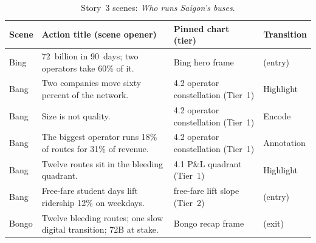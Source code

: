 \begin{table}[!htbp]
\centering
\caption{Story~3 scenes: \textit{Who runs Saigon's buses}.}
\label{tab:themes:story_money}
\footnotesize
\begin{tabularx}{\linewidth}{p{0.8cm}Xp{2.7cm}p{1.6cm}}
\hline
\textbf{Scene} & \textbf{Action title (scene opener)} & \textbf{Pinned chart (tier)} & \textbf{Transition} \\
\hline
Bing  & \textdong{}72~billion in 90~days; two operators take 60\% of it.                & Bing hero frame                          & (entry)    \\
Bang  & Two companies move sixty percent of the network.                              & 4.2 operator constellation (Tier~1)      & Highlight  \\
Bang  & Size is not quality.                                                          & 4.2 operator constellation (Tier~1)      & Encode     \\
Bang  & The biggest operator runs 18\% of routes for 31\% of revenue.                  & 4.2 operator constellation (Tier~1)      & Annotation \\
Bang  & Twelve routes sit in the bleeding quadrant.                                   & 4.1 P\&L quadrant (Tier~1)               & Highlight  \\
Bang  & Free-fare student days lift ridership 12\% on weekdays.                        & free-fare lift slope (Tier~2)            & (entry)    \\
Bongo & Twelve bleeding routes; one slow digital transition; \textdong{}72B at stake. & Bongo recap frame                        & (exit)     \\
\hline
\end{tabularx}
\end{table}

